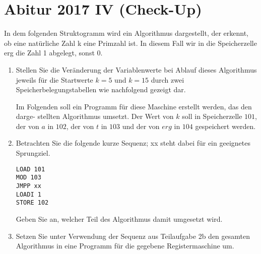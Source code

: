 \documentclass{lehramt-informatik-aufgabe}
\begin{document}

\section{Abitur 2017 IV (Check-Up)}

In dem folgenden Struktogramm wird ein Algorithmus dargestellt, der
erkennt, ob eine natürliche Zahl k eine Primzahl ist. In diesem Fall wir
in die Speicherzelle erg die Zahl 1 abgelegt, sonst 0.

\begin{enumerate}


\item Stellen Sie die Veränderung der Variablenwerte bei Ablauf dieses
Algorithmus jeweils für die Startwerte $k = 5$ und $k = 15$ durch zwei
Speicherbelegungstabellen wie nachfolgend gezeigt dar.

Im Folgenden soll ein Programm für diese Maschine erstellt werden, das
den darge- stellten Algorithmus umsetzt. Der Wert von $k$ soll in
Speicherzelle $101$, der von $a$ in $102$, der von $t$ in $103$ und der
von $erg$ in $104$ gespeichert werden.


\item Betrachten Sie die folgende kurze Sequenz; xx steht dabei für ein
geeignetes Sprungziel.

\begin{verbatim}
LOAD 101
MOD 103
JMPP xx
LOADI 1
STORE 102
\end{verbatim}

Geben Sie an, welcher Teil des Algorithmus damit umgesetzt wird.


\item Setzen Sie unter Verwendung der Sequenz aus Teilaufgabe 2b den
gesamten Algorithmus in eine Programm für die gegebene Registermaschine
um.
\end{enumerate}
\end{document}
